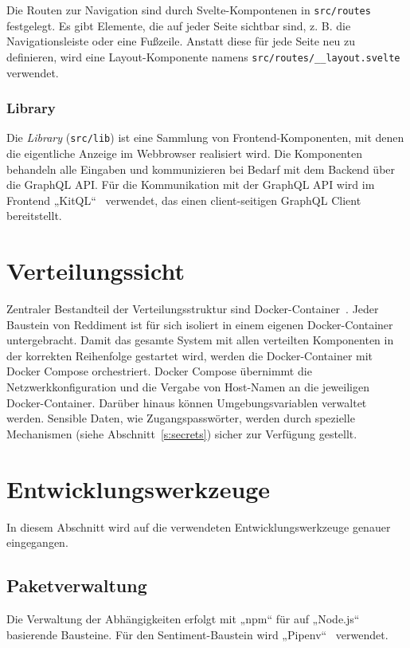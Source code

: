 \documentclass[a4paper, 10pt, conference]{IEEEtran}
\begin{document}
Die Routen zur Navigation sind durch Svelte-Kompontenen in \texttt{src/routes} festgelegt. Es gibt Elemente, die auf jeder Seite sichtbar sind, z. B. die Navigationsleiste oder eine Fußzeile. Anstatt diese für jede Seite neu zu definieren,  wird eine Layout-Komponente namens \texttt{src/routes/\_\_layout.svelte} verwendet.

\subsubsection{Library}

Die \textit{Library} (\texttt{src/lib}) ist eine Sammlung von Frontend-Komponenten,  mit denen die eigentliche Anzeige im Webbrowser realisiert wird. Die Komponenten behandeln alle Eingaben und kommunizieren bei Bedarf mit dem Backend über die GraphQL API. Für die Kommunikation mit der GraphQL API wird im Frontend „KitQL“~\cite{kitql} verwendet, das einen client-seitigen GraphQL Client bereitstellt.

\section{Verteilungssicht} \label{s:verteilungssicht}
Zentraler Bestandteil der Verteilungsstruktur sind Docker-Container~\cite{docker}. Jeder Baustein von Reddiment ist für sich isoliert in einem eigenen Docker-Container untergebracht.
Damit das gesamte System mit allen verteilten Komponenten in der korrekten Reihenfolge gestartet wird, werden die Docker-Container mit Docker Compose orchestriert.
Docker Compose übernimmt die Netzwerkkonfiguration und die Vergabe von Host-Namen an die jeweiligen Docker-Container.
Darüber hinaus können Umgebungsvariablen verwaltet werden. Sensible Daten, wie Zugangspasswörter, werden durch spezielle Mechanismen (siehe Abschnitt~\ref{s:secrets}) sicher zur Verfügung gestellt.

\section{Entwicklungswerkzeuge} \label{s:entwicklungswerkzeuge}

In diesem Abschnitt wird auf die verwendeten Entwicklungswerkzeuge genauer eingegangen.

\subsection{Paketverwaltung}

Die Verwaltung der Abhängigkeiten erfolgt mit „npm“ \cite{npm} für auf „Node.js“ basierende Bausteine. Für den Sentiment-Baustein wird „Pipenv“~\cite{pipenv} verwendet.
\end{document}
